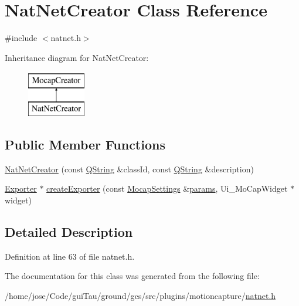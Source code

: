 \hypertarget{class_nat_net_creator}{\section{Nat\-Net\-Creator Class Reference}
\label{class_nat_net_creator}
}


{\ttfamily \#include $<$natnet.\-h$>$}

Inheritance diagram for Nat\-Net\-Creator\-:\begin{figure}[H]
\begin{center}
\leavevmode
\includegraphics[height=2.000000cm]{class_nat_net_creator}
\end{center}
\end{figure}
\subsection*{Public Member Functions}
\begin{DoxyCompactItemize}
\item 
\hyperlink{group__mocap_ga7eceb6d31ea96db4e00bdf9c6765b4b7}{Nat\-Net\-Creator} (const \hyperlink{group___u_a_v_objects_plugin_gab9d252f49c333c94a72f97ce3105a32d}{Q\-String} \&class\-Id, const \hyperlink{group___u_a_v_objects_plugin_gab9d252f49c333c94a72f97ce3105a32d}{Q\-String} \&description)
\item 
\hyperlink{class_exporter}{Exporter} $\ast$ \hyperlink{group__mocap_ga1d23a419317ce602e13c9dffd77de68a}{create\-Exporter} (const \hyperlink{group___mo_cap_plugin_ga6083347a5b3eb70e360f599354dc0f0b}{Mocap\-Settings} \&\hyperlink{glext_8h_afeb6390ab3bc8a0e96a88aff34d52288}{params}, Ui\-\_\-\-Mo\-Cap\-Widget $\ast$widget)
\end{DoxyCompactItemize}


\subsection{Detailed Description}


Definition at line 63 of file natnet.\-h.



The documentation for this class was generated from the following file\-:\begin{DoxyCompactItemize}
\item 
/home/jose/\-Code/gui\-Tau/ground/gcs/src/plugins/motioncapture/\hyperlink{natnet_8h}{natnet.\-h}\end{DoxyCompactItemize}
